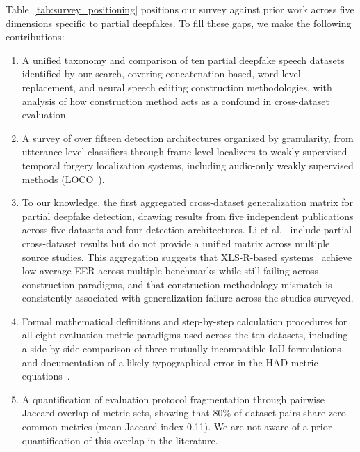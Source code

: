 \documentclass[journal]{IEEEtran}
\begin{document}
Table~\ref{tab:survey_positioning} positions our survey against prior work across five dimensions specific to partial deepfakes. To fill these gaps, we make the following contributions:
\begin{enumerate}
\item A unified taxonomy and comparison of ten partial deepfake speech datasets identified by our search, covering concatenation-based, word-level replacement, and neural speech editing construction methodologies, with analysis of how construction method acts as a confound in cross-dataset evaluation.
\item A survey of over fifteen detection architectures organized by granularity, from utterance-level classifiers through frame-level localizers to weakly supervised temporal forgery localization systems, including audio-only weakly supervised methods (LOCO~\cite{wu2025loco}).
\item To our knowledge, the first aggregated cross-dataset generalization matrix for partial deepfake detection, drawing results from five independent publications across five datasets and four detection architectures. Li et al.~\cite{li2025survey} include partial cross-dataset results but do not provide a unified matrix across multiple source studies. This aggregation suggests that XLS-R-based systems~\cite{zhang2024xlrsls,wu2024cfprf,wu2025loco} achieve low average EER across multiple benchmarks while still failing across construction paradigms, and that construction methodology mismatch is consistently associated with generalization failure across the studies surveyed.
\item Formal mathematical definitions and step-by-step calculation procedures for all eight evaluation metric paradigms used across the ten datasets, including a side-by-side comparison of three mutually incompatible IoU formulations and documentation of a likely typographical error in the HAD metric equations~\cite{yi2021had}.
\item A quantification of evaluation protocol fragmentation through pairwise Jaccard overlap of metric sets, showing that 80\% of dataset pairs share zero common metrics (mean Jaccard index 0.11). We are not aware of a prior quantification of this overlap in the literature.
\end{enumerate}
\end{document}
